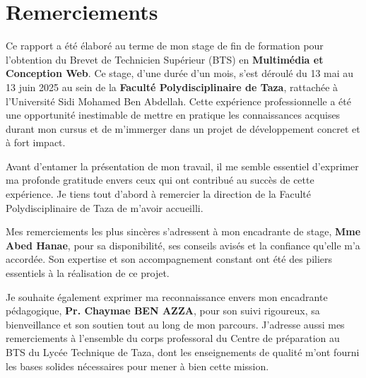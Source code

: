 \documentclass[12pt,a4paper]{report}
\begin{document}
\tableofcontents
\newpage


\chapter*{Remerciements}

Ce rapport a été élaboré au terme de mon stage de fin de formation pour l'obtention du Brevet de Technicien Supérieur (BTS) en \textbf{Multimédia et Conception Web}. Ce stage, d'une durée d'un mois, s'est déroulé du 13 mai au 13 juin 2025 au sein de la \textbf{Faculté Polydisciplinaire de Taza}, rattachée à l'Université Sidi Mohamed Ben Abdellah. Cette expérience professionnelle a été une opportunité inestimable de mettre en pratique les connaissances acquises durant mon cursus et de m'immerger dans un projet de développement concret et à fort impact.

Avant d'entamer la présentation de mon travail, il me semble essentiel d'exprimer ma profonde gratitude envers ceux qui ont contribué au succès de cette expérience. Je tiens tout d'abord à remercier la direction de la Faculté Polydisciplinaire de Taza de m'avoir accueilli.

Mes remerciements les plus sincères s'adressent à mon encadrante de stage, \textbf{Mme Abed Hanae}, pour sa disponibilité, ses conseils avisés et la confiance qu'elle m'a accordée. Son expertise et son accompagnement constant ont été des piliers essentiels à la réalisation de ce projet.

Je souhaite également exprimer ma reconnaissance envers mon encadrante pédagogique, \textbf{Pr. Chaymae BEN AZZA}, pour son suivi rigoureux, sa bienveillance et son soutien tout au long de mon parcours. J'adresse aussi mes remerciements à l'ensemble du corps professoral du Centre de préparation au BTS du Lycée Technique de Taza, dont les enseignements de qualité m'ont fourni les bases solides nécessaires pour mener à bien cette mission.
\end{document}
